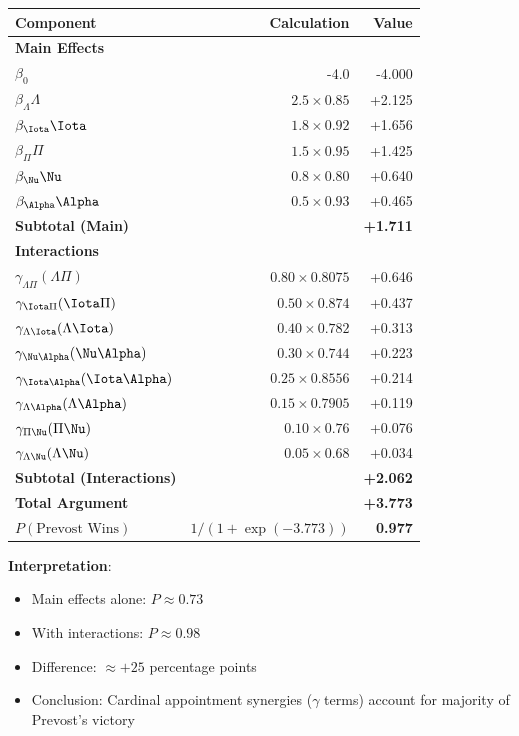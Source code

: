 \documentclass[11pt]{article}
\begin{document}
\begin{table}[h]
\centering
\small
\begin{tabular}{|l|r|r|}
\hline
\textbf{Component} & \textbf{Calculation} & \textbf{Value} \\
\hline
\multicolumn{3}{|l|}{\textbf{Main Effects}} \\
\hline
$\beta_0$ & -4.0 & -4.000 \\
$\beta_\Lambda \Lambda$ & $2.5 \times 0.85$ & +2.125 \\
$\beta_\Iota \Iota$ & $1.8 \times 0.92$ & +1.656 \\
$\beta_\Pi \Pi$ & $1.5 \times 0.95$ & +1.425 \\
$\beta_\Nu \Nu$ & $0.8 \times 0.80$ & +0.640 \\
$\beta_\Alpha \Alpha$ & $0.5 \times 0.93$ & +0.465 \\
\hline
\textbf{Subtotal (Main)} & & \textbf{+1.711} \\
\hline
\multicolumn{3}{|l|}{\textbf{Interactions}} \\
\hline
$\gamma_{\Lambda\Pi}(\Lambda \Pi)$ & $0.80 \times 0.8075$ & +0.646 \\
$\gamma_{\Iota\Pi}(\Iota \Pi)$ & $0.50 \times 0.874$ & +0.437 \\
$\gamma_{\Lambda\Iota}(\Lambda \Iota)$ & $0.40 \times 0.782$ & +0.313 \\
$\gamma_{\Nu\Alpha}(\Nu \Alpha)$ & $0.30 \times 0.744$ & +0.223 \\
$\gamma_{\Iota\Alpha}(\Iota \Alpha)$ & $0.25 \times 0.8556$ & +0.214 \\
$\gamma_{\Lambda\Alpha}(\Lambda \Alpha)$ & $0.15 \times 0.7905$ & +0.119 \\
$\gamma_{\Pi\Nu}(\Pi \Nu)$ & $0.10 \times 0.76$ & +0.076 \\
$\gamma_{\Lambda\Nu}(\Lambda \Nu)$ & $0.05 \times 0.68$ & +0.034 \\
\hline
\textbf{Subtotal (Interactions)} & & \textbf{+2.062} \\
\hline
\textbf{Total Argument} & & \textbf{+3.773} \\
\hline
$P(\text{Prevost Wins})$ & $1/(1+\exp(-3.773))$ & \textbf{0.977} \\
\hline
\end{tabular}
\end{table}

\textbf{Interpretation}:
\begin{itemize}
\item Main effects alone: $P \approx 0.73$
\item With interactions: $P \approx 0.98$
\item Difference: $\approx +25$ percentage points
\item Conclusion: Cardinal appointment synergies ($\gamma$ terms) account for majority of Prevost's victory
\end{itemize}
\end{document}
